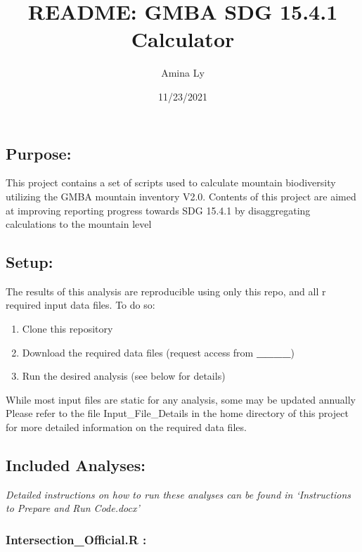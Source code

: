 \documentclass[
]{article}
\title{README: GMBA SDG 15.4.1 Calculator}
\author{Amina Ly}
\date{11/23/2021}
\providecommand{\tightlist}{%
  \setlength{\itemsep}{0pt}\setlength{\parskip}{0pt}}
\begin{document}
\maketitle

\hypertarget{purpose}{%
\subsection{Purpose:}\label{purpose}}

This project contains a set of scripts used to calculate mountain
biodiversity utilizing the GMBA mountain inventory V2.0. Contents of
this project are aimed at improving reporting progress towards SDG
15.4.1 by disaggregating calculations to the mountain level

\hypertarget{setup}{%
\subsection{Setup:}\label{setup}}

The results of this analysis are reproducible using only this repo, and
all r required input data files. To do so:

\begin{enumerate}
\def\labelenumi{\arabic{enumi}.}
\tightlist
\item
  Clone this repository
\item
  Download the required data files (request access from
  \textbf{\_\_\_\_})
\item
  Run the desired analysis (see below for details)
\end{enumerate}

While most input files are static for any analysis, some may be updated
annually Please refer to the file Input\_File\_Details in the home
directory of this project for more detailed information on the required
data files.

\hypertarget{included-analyses}{%
\subsection{Included Analyses:}\label{included-analyses}}

\emph{Detailed instructions on how to run these analyses can be found in
`Instructions to Prepare and Run Code.docx'}

\hypertarget{intersection_official.r}{%
\subsubsection{Intersection\_Official.R
:}\label{intersection_official.r}}
\end{document}
